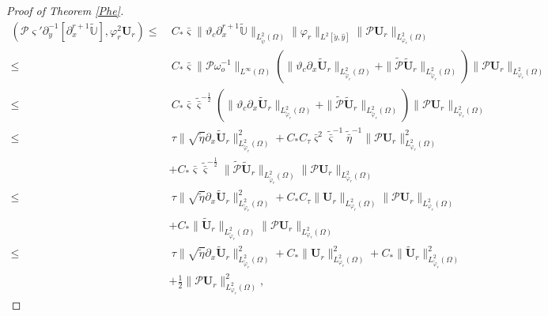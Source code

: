 \documentclass{amsart}
\numberwithin{equation}{section}
\begin{document}
\begin{proof}[Proof of Theorem \ref{Phe}]
\begin{align}
(\mathcal{P}\varsigma'\partial_{y}^{-1}[\partial_{x}^{r+1}\tilde{\mathbb{U}}],\varphi_{r}^{2}\mathbf{U}_{r})
\leq&~C_{*}\bar{\varsigma}\|\vartheta_{c}\partial_{x}^{r+1}\tilde{\mathbb{U}}\|_{L_{\check{\psi}}^{2}(\Omega)}
                 \|\varphi_{r}\|_{L^{2}[\check{y},\hat{y}]}
                 \|\mathcal{P}\mathbf{U}_{r}\|_{L_{\varphi_{r}}^{2}(\Omega)}\\
\leq&~C_{*}\bar{\varsigma}\|\mathcal{P}\omega_{o}^{-1}\|_{L^{\infty}(\Omega)}
      \left(\|\vartheta_{c}\partial_{x}\tilde{\mathbf{U}}_{r}\|_{L_{\tilde{\varphi}_{r}}^{2}(\Omega)}
            +\|\tilde{\mathcal{P}}\tilde{\mathbf{U}}_{r}\|_{L_{\tilde{\varphi}_{r}}^{2}(\Omega)}\right)
      \|\mathcal{P}\mathbf{U}_{r}\|_{L_{\varphi_{r}}^{2}(\Omega)}\nonumber\\
\leq&~C_{*}\bar{\varsigma}\tilde{\bar{\varsigma}}^{-\frac{1}{2}}
      \left(\|\vartheta_{c}\partial_{x}\tilde{\mathbf{U}}_{r}\|_{L_{\tilde{\varphi}_{r}}^{2}(\Omega)}
            +\|\tilde{\mathcal{P}}\tilde{\mathbf{U}}_{r}\|_{L_{\tilde{\varphi}_{r}}^{2}(\Omega)}\right)
      \|\mathcal{P}\mathbf{U}_{r}\|_{L_{\varphi_{r}}^{2}(\Omega)}\nonumber\\
\leq&~\tau\|\sqrt{\tilde{\eta}}\partial_{x}\tilde{\mathbf{U}}_{r}\|_{L_{\tilde{\varphi}_{r}}^{2}(\Omega)}^{2}
     +C_{*}C_{\tau}\bar{\varsigma}^{2}\tilde{\bar{\varsigma}}^{-1}\tilde{\bar{\eta}}^{-1}\|\mathcal{P}\mathbf{U}_{r}\|_{L_{\varphi_{r}}^{2}(\Omega)}^{2}\nonumber\\
    &+C_{*}\bar{\varsigma}\tilde{\bar{\varsigma}}^{-\frac{1}{2}}\|\tilde{\mathcal{P}}\tilde{\mathbf{U}}_{r}\|_{L_{\tilde{\varphi}_{r}}^{2}(\Omega)}
                                              \|\mathcal{P}\mathbf{U}_{r}\|_{L_{\varphi_{r}}^{2}(\Omega)}\nonumber\\
\leq&~\tau\|\sqrt{\tilde{\eta}}\partial_{x}\tilde{\mathbf{U}}_{r}\|_{L_{\tilde{\varphi}_{r}}^{2}(\Omega)}^{2}
     +C_{*}C_{\tau}\|\mathbf{U}_{r}\|_{L_{\varphi_{r}}^{2}(\Omega)}\|\mathcal{P}\mathbf{U}_{r}\|_{L_{\varphi_{r}}^{2}(\Omega)}\nonumber\\
    &+C_{*}\|\tilde{\mathbf{U}}_{r}\|_{L_{\tilde{\varphi}_{r}}^{2}(\Omega)}\|\mathcal{P}\mathbf{U}_{r}\|_{L_{\varphi_{r}}^{2}(\Omega)}\nonumber\\
\leq&~\tau\|\sqrt{\tilde{\eta}}\partial_{x}\tilde{\mathbf{U}}_{r}\|_{L_{\tilde{\varphi}_{r}}^{2}(\Omega)}^{2}
     +C_{*}\|\mathbf{U}_{r}\|_{L_{\varphi_{r}}^{2}(\Omega)}^{2}
     +C_{*}\|\tilde{\mathbf{U}}_{r}\|_{L_{\tilde{\varphi}_{r}}^{2}(\Omega)}^{2}\nonumber\\
    &+\frac{1}{2}\|\mathcal{P}\mathbf{U}_{r}\|_{L_{\varphi_{r}}^{2}(\Omega)}^{2},\nonumber

\end{align}
\end{proof}
\end{document}
